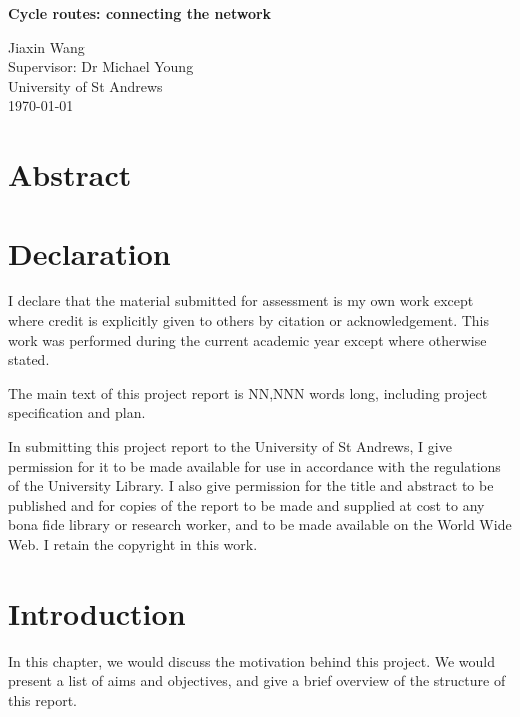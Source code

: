 \documentclass[12pt,a4paper]{report}
\begin{document}
\pagestyle{empty}

\vspace*{60mm}
\begin{center}
\Huge
\textbf{Cycle routes: connecting the network}

\vfill
\large
Jiaxin Wang \\[3mm]
Supervisor: Dr Michael Young \\[3mm]
University of St Andrews \\[3mm]
\today  %
\end{center}
\thispagestyle{empty}

\pagestyle{plain}
\chapter*{Abstract}

\chapter*{Declaration}
I declare that the material submitted for assessment is my own work except where credit is explicitly given to others by citation or acknowledgement. This work was performed during the current academic year except where otherwise stated.

The main text of this project report is NN,NNN words long, including project specification and plan.

In submitting this project report to the University of St Andrews, I give permission for it to be made available for use in accordance with the regulations of the University Library. I also give permission for the title and abstract to be published and for copies of the report to be made and supplied at cost to any bona fide library or research worker, and to be made available on the World Wide Web. I retain the copyright in this work.

\clearpage
\setcounter{page}{1}

\tableofcontents

\listoffigures

\newpage
{}

\chapter{Introduction}
In this chapter, we would discuss the motivation behind this project. We would present a list of aims and objectives, and give a brief overview of the structure of this report.
\end{document}
